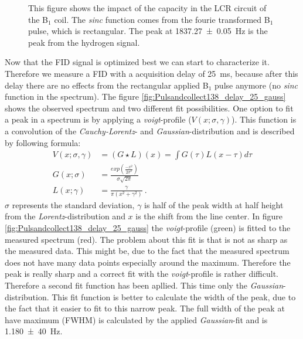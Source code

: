 \begin{figure}[H]
    \centering
    
    \caption[This figure shows the impact of the capacity in the LCR circuit of the B$_1$ coil.]{This figure shows the impact of the capacity in the LCR circuit of the B$_1$ coil. The \textit{sinc} function comes from the fourie transformed B$_1$ pulse, which is rectangular. The peak at \SI{1837.27 \pm 0.05}{\hertz} is the peak from the hydrogen signal.}
    \label{fig:Pulsandcollect}
\end{figure}
Now that the FID signal is optimized best we can start to characterize it. Therefore we measure a FID with a acquisition delay of \SI{25}{\milli \second}, because after this delay there are no effects from the rectangular applied B$_1$ pulse anymore (no \textit{sinc} function in the spectrum). The figure \ref{fig:Pulsandcollect138_delay_25_gauss} shows the observed spectrum and two different fit possibilities.\newline
One option to fit a peak in a spectrum is by applying a \textit{voigt}-profile ($V(x;\sigma , \gamma)$). This function is a convolution of the \textit{Cauchy-Lorentz}- and \textit{Gaussian}-distribution and is described by following formula:
\begin{align}
    V(x;\sigma , \gamma) &= ( G \star L)(x) = \int G(\tau) L(x-\tau) d\tau \\
    G(x;\sigma) &= \frac{exp\left(\frac{-x^2}{2\sigma^2}\right)}{\sigma \sqrt{2 \pi}} \\
    L(x;\gamma)  &= \frac{\gamma}{\pi \left( x^2+\gamma^2\right)} \ .
    \label{eq: voigt} 
\end{align}
$\sigma$ represents the standard deviation, $\gamma$ is half of the peak width at half height from the \textit{Lorentz}-distribution and $x$ is the shift from the line center. In figure \ref{fig:Pulsandcollect138_delay_25_gauss} the \textit{voigt}-profile (green) is fitted to the measured spectrum (red). The problem about this fit is that is not as sharp as the measured data. This might be, due to the fact that the measured spectrum does not have many data points especially around the maximum. Therefore the peak is really sharp and a correct fit with the \textit{voigt}-profile is rather difficult. Therefore a second fit function has been apllied. This time only the \textit{Gaussian}-distribution. This fit function is better to calculate the width of the peak, due to the fact that it easier to fit to this narrow peak. The full width of the peak at have maximum (FWHM) is calculated by the applied \textit{Gaussian}-fit and is \SI{1.180 \pm 40}{\hertz}. \newline

